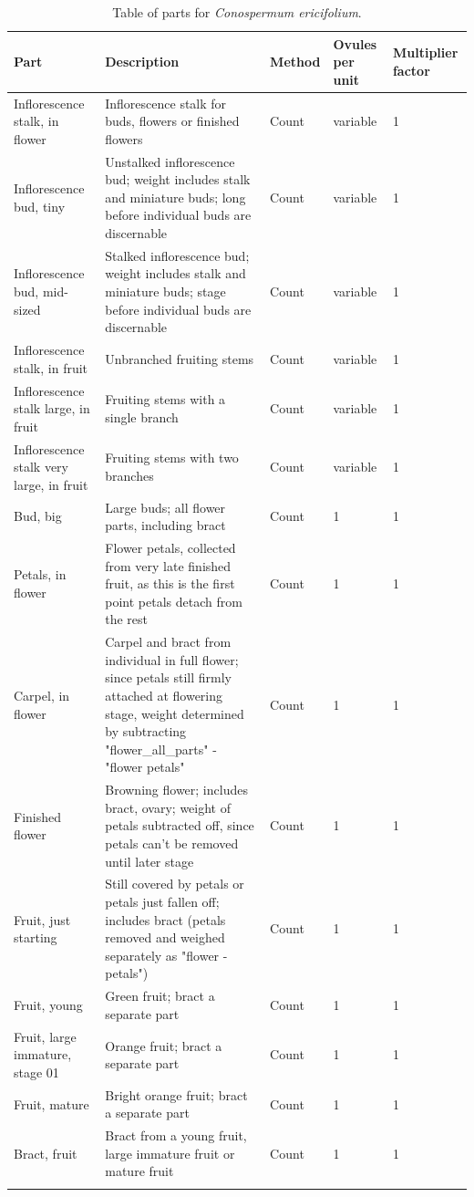 \documentclass[10pt,twoside]{article}\usepackage[]{graphicx}\usepackage[]{color}
\begin{document}
\clearpage
\begingroup\small
\begin{longtable}{p{4.5cm}p{6cm}p{2cm}p{1cm}p{1cm}}
\caption{Table of parts for \emph{Conospermum ericifolium}.} \\ 
  \hline
Part & Description & Method & Ovules per unit & Multiplier factor \\ 
  \hline
Inflorescence stalk, in flower & Inflorescence stalk for buds, flowers or finished flowers & Count & variable &   1 \\ 
  Inflorescence bud, tiny & Unstalked inflorescence bud; weight includes stalk and miniature buds; long before individual buds are discernable & Count & variable &   1 \\ 
  Inflorescence bud, mid-sized & Stalked  inflorescence bud; weight includes stalk and miniature buds; stage before individual buds are discernable & Count & variable &   1 \\ 
  Inflorescence stalk, in fruit & Unbranched fruiting stems & Count & variable &   1 \\ 
  Inflorescence stalk large, in fruit & Fruiting stems with a single branch & Count & variable &   1 \\ 
  Inflorescence stalk very large, in fruit & Fruiting stems with two branches & Count & variable &   1 \\ 
  Bud, big & Large buds; all flower parts, including bract & Count & 1 &   1 \\ 
  Petals, in flower & Flower petals, collected from very late finished fruit, as this is the first point petals detach from the rest & Count & 1 &   1 \\ 
  Carpel, in flower & Carpel and bract from individual in full flower; since petals still firmly attached at flowering stage, weight determined by subtracting "flower\_all\_parts" - "flower petals" & Count & 1 &   1 \\ 
  Finished flower & Browning flower; includes bract, ovary; weight of petals subtracted off, since petals can't be removed until later stage & Count & 1 &   1 \\ 
  Fruit, just starting & Still covered by petals or petals just fallen off; includes bract (petals removed and weighed separately as "flower - petals") & Count & 1 &   1 \\ 
  Fruit, young & Green fruit; bract a separate part & Count & 1 &   1 \\ 
  Fruit, large immature, stage 01 & Orange fruit; bract a separate part & Count & 1 &   1 \\ 
  Fruit, mature & Bright orange fruit; bract a separate part & Count & 1 &   1 \\ 
  Bract, fruit & Bract from a young fruit, large immature fruit or mature fruit & Count & 1 &   1 \\ 
   \hline
\hline
\label{tab:parts_Conospermum_ericifolium}
\end{longtable}
\endgroup
\end{document}
